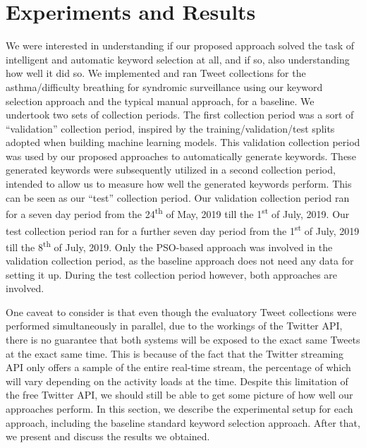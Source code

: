 \documentclass[runningheads]{llncs}
\begin{document}
\section{Experiments and Results}
We were interested in understanding if our proposed approach solved the task of intelligent and automatic keyword selection at all, and if so, also understanding how well it did so. We implemented and ran Tweet collections for the asthma/difficulty breathing for syndromic surveillance using our keyword selection approach and the typical manual approach, for a baseline. We undertook two sets of collection periods. The first collection period was a sort of ``validation'' collection period, inspired by the training/validation/test splits adopted when building machine learning models. This validation collection period was used by our proposed approaches to automatically generate keywords. These generated keywords were subsequently utilized in a second collection period, intended to allow us to measure how well the generated keywords perform. This can be seen as our ``test'' collection period. Our validation collection period ran for a seven day period from the  24\textsuperscript{th} of May, 2019 till the 1\textsuperscript{st} of July, 2019. Our test collection period ran for a further seven day period from the 1\textsuperscript{st} of July, 2019 till the 8\textsuperscript{th} of July, 2019. Only the PSO-based approach was involved in the validation collection period, as the baseline approach does not need any data for setting it up. During the test collection period however, both approaches are involved.

One caveat to consider is that even though the evaluatory Tweet collections were performed simultaneously in parallel, due to the workings of the Twitter API, there is no guarantee that both systems will be exposed to the exact same Tweets at the exact same time. This is because of the fact that the Twitter streaming API only offers a sample of the entire real-time stream, the percentage of which will vary depending on the activity loads at the time. Despite this limitation of the free Twitter API, we should still be able to get some picture of how well our approaches perform. In this section, we describe the experimental setup for each approach, including the baseline standard keyword selection approach. After that, we present and discuss the results we obtained.
\end{document}
